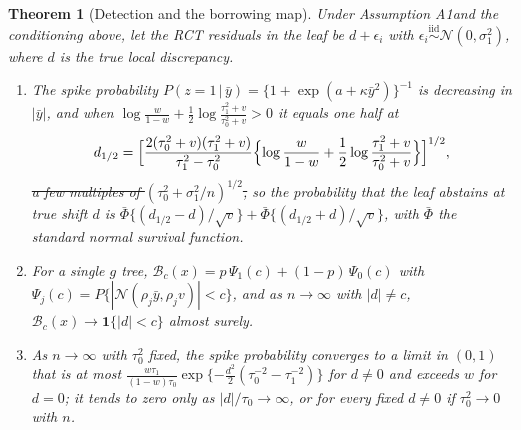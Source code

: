 \documentclass[11pt]{article}
\newcommand{\Normal}{\mathcal{N}}
\newcommand{\given}{\,\vert\,}
\newcommand{\iid}{\stackrel{\text{iid}}{\sim}}
\newtheorem{theorem}{Theorem}
\theoremstyle{definition}
\theoremstyle{plain}
\providecommand{\DIFaddtex}[1]{{\protect\color{blue}\uwave{#1}}} %
\providecommand{\DIFdeltex}[1]{{\protect\color{red}\sout{#1}}}                      %
\providecommand{\DIFaddbegin}{} %
\providecommand{\DIFaddend}{} %
\providecommand{\DIFdelbegin}{} %
\providecommand{\DIFdelend}{} %
\providecommand{\DIFadd}[1]{\texorpdfstring{\DIFaddtex{#1}}{#1}} %
\providecommand{\DIFdel}[1]{\texorpdfstring{\DIFdeltex{#1}}{}} %
\newcommand{\DIFscaledelfig}{0.5}
\newlength{\DIFdelgraphicswidth} %
\newlength{\DIFdelgraphicsheight} %
\newcommand{\DIFaddincludegraphics}[2][]{{\color{blue}\fbox{\DIFOincludegraphics[#1]{#2}}}} %
\newcommand{\DIFdelincludegraphics}[2][]{%
\sbox{\DIFdelgraphicsbox}{\DIFOincludegraphics[#1]{#2}}%
\settoboxwidth{\DIFdelgraphicswidth}{\DIFdelgraphicsbox} %
\settoboxtotalheight{\DIFdelgraphicsheight}{\DIFdelgraphicsbox} %
\scalebox{\DIFscaledelfig}{%
\parbox[b]{\DIFdelgraphicswidth}{\usebox{\DIFdelgraphicsbox}\\[-\baselineskip] \rule{\DIFdelgraphicswidth}{0em}}\llap{\resizebox{\DIFdelgraphicswidth}{\DIFdelgraphicsheight}{%
\setlength{\unitlength}{\DIFdelgraphicswidth}%
\begin{picture}(1,1)%
\thicklines\linethickness{2pt} %
{\color[rgb]{1,0,0}\put(0,0){\framebox(1,1){}}}%
{\color[rgb]{1,0,0}\put(0,0){\line( 1,1){1}}}%
{\color[rgb]{1,0,0}\put(0,1){\line(1,-1){1}}}%
\end{picture}%
}\hspace*{3pt}}} %
} %
\DeclareRobustCommand{\DIFaddbegin}{\DIFOaddbegin \let\includegraphics\DIFaddincludegraphics} %
\DeclareRobustCommand{\DIFaddend}{\DIFOaddend \let\includegraphics\DIFOincludegraphics} %
\DeclareRobustCommand{\DIFdelbegin}{\DIFOdelbegin \let\includegraphics\DIFdelincludegraphics} %
\DeclareRobustCommand{\DIFdelend}{\DIFOaddend \let\includegraphics\DIFOincludegraphics} %
\begin{document}
\begin{theorem}[Detection and the borrowing map]\label{thm:map}
Under Assumption A1\DIFaddbegin \DIFadd{, $0<w<1$, }\DIFaddend and the conditioning above, let the RCT residuals in the leaf be $d+\epsilon_i$ with $\epsilon_i\iid\Normal(0,\sigma_1^2)$, where $d$ is the true local discrepancy.
\begin{enumerate}[label=(\alph*),leftmargin=2.2em]
\item The spike probability $P(z=1\given\bar y)=\{1+\exp(a+\kappa\bar y^2)\}^{-1}$ is decreasing in $|\bar y|$, and when $\log\frac{w}{1-w}+\frac{1}{2}\log\frac{\tau_1^2+v}{\tau_0^2+v}>0$ it equals one half at
\[
d_{1/2}=\Bigl[\frac{2(\tau_0^2+v)(\tau_1^2+v)}{\tau_1^2-\tau_0^2}\Bigl\{\log\frac{w}{1-w}+\frac{1}{2}\log\frac{\tau_1^2+v}{\tau_0^2+v}\Bigr\}\Bigr]^{1/2},
\]
\DIFdelbegin \DIFdel{a few multiples of $(\tau_0^2+\sigma_1^2/n)^{1/2}$, }\DIFdelend so the probability that the leaf abstains at true shift $d$ is $\bar\Phi\{(d_{1/2}-d)/\sqrt v\}+\bar\Phi\{(d_{1/2}+d)/\sqrt v\}$, with $\bar\Phi$ the standard normal survival function.
\item For a single $g$ tree, $\mathcal B_c(x)=p\,\Psi_1(c)+(1-p)\,\Psi_0(c)$ with $\Psi_j(c)=P\{|\Normal(\rho_j\bar y,\rho_jv)|<c\}$, and as $n\to\infty$ with $|d|\ne c$, $\mathcal B_c(x)\to\mathbf 1\{|d|<c\}$ almost surely.
\item As $n\to\infty$ with $\tau_0^2$ fixed, the spike probability converges to a limit in $(0,1)$ that is at most $\frac{w\tau_1}{(1-w)\tau_0}\exp\{-\frac{d^2}{2}(\tau_0^{-2}-\tau_1^{-2})\}$ for $d\ne0$ and exceeds $w$ for $d=0$; it tends to zero only as $|d|/\tau_0\to\infty$, or for every fixed $d\ne0$ if $\tau_0^2\to0$ with $n$.
\end{enumerate}
\end{theorem}
\end{document}
